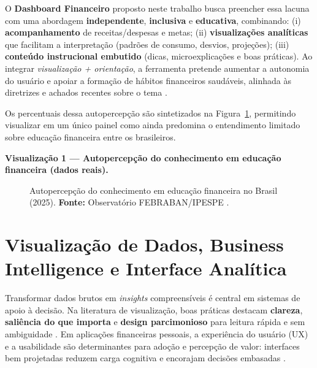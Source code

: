 O \textbf{Dashboard Financeiro} proposto neste trabalho busca preencher essa lacuna com uma abordagem \textbf{independente}, \textbf{inclusiva} e \textbf{educativa}, combinando:
(i) \textbf{acompanhamento} de receitas/despesas e metas;
(ii) \textbf{visualizações analíticas} que facilitam a interpretação (padrões de consumo, desvios, projeções);
(iii) \textbf{conteúdo instrucional embutido} (dicas, microexplicações e boas práticas).
Ao integrar \textit{visualização + orientação}, a ferramenta pretende aumentar a autonomia do usuário e apoiar a formação de hábitos financeiros saudáveis, alinhada às diretrizes e achados recentes sobre o tema \cite{ANBIMA2024}.

Os percentuais dessa autopercepção são sintetizados na Figura~\ref{fig:educacao_financeira_percepcao}, permitindo visualizar em um único painel como ainda predomina o entendimento limitado sobre educação financeira entre os brasileiros.

\vspace{0.5em}
\textbf{Visualização 1 — Autopercepção do conhecimento em educação financeira (dados reais).}

\begin{figure}[ht]
\centering
{}
\caption{Autopercepção do conhecimento em educação financeira no Brasil (2025). \textbf{Fonte:} Observatório FEBRABAN/IPESPE \cite{FEBRABAN2025}.}
\label{fig:educacao_financeira_percepcao}
\end{figure}

\section{Visualização de Dados, Business Intelligence e Interface Analítica}
Transformar dados brutos em \textit{insights} compreensíveis é central em sistemas de apoio à decisão. Na literatura de visualização, boas práticas destacam \textbf{clareza}, \textbf{saliência do que importa} e \textbf{design parcimonioso} para leitura rápida e sem ambiguidade \cite{MUNZNER2014,FEW2017}. Em aplicações financeiras pessoais, a experiência do usuário (UX) e a usabilidade são determinantes para adoção e percepção de valor: interfaces bem projetadas reduzem carga cognitiva e encorajam decisões embasadas \cite{NIELSEN1994}.

